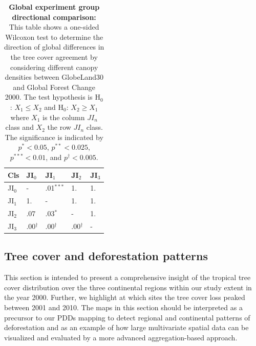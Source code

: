 			\begin{table}[ht]
				\centering
				\caption[Global experiment group directional comparison]{\textbf{Global experiment group directional comparison:} This table shows a one-sided Wilcoxon test to determine the direction of global differences in the tree cover agreement by considering different canopy densities between GlobeLand30 and Global Forest Change 2000. The test hypothesis is H$_0$: $X_1\leq X_2$ and H$_0$: $X_2\geq X_1$ where $X_1$ is the column $JI_n$ class and $X_2$ the row $JI_n$ class. The significance is indicated by $p^{*}<0.05$, $p^{**}<0.025$, $p^{***}<0.01$, and $p^{\dagger}<0.005$.}
				\label{tab:wilcoxononesided_all}
				\begin{tabular}{lllll}
					\hline
					Cls & JI$_0$ & JI$_1$ & JI$_2$ & JI$_3$ \\\hline
					JI$_0$ & - & .01$^{***}$ & 1. & 1. \\
					JI$_1$ & 1. & - & 1. & 1. \\
					JI$_2$ & .07 & .03$^{*}$ & - & 1. \\
					JI$_3$ & .00$^{\dagger}$ & .00$^{\dagger}$ & .00$^{\dagger}$ & - \\\hline
				\end{tabular}
			\end{table}

		\subsection{Tree cover and deforestation patterns}
		\label{subsec:results_tree_cover_and_deforestation}
			This section is intended to present a comprehensive insight of the tropical tree cover distribution over the three continental regions within our study extent in the year 2000. Further, we highlight at which sites the tree cover loss peaked between 2001 and 2010. The maps in this section should be interpreted as a precursor to our \acp{PDD} mapping to detect regional and continental patterns of deforestation and as an example of how large multivariate spatial data can be visualized and evaluated by a more advanced aggregation-based approach.

